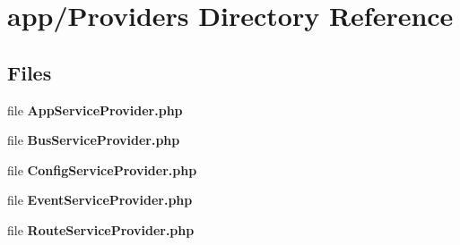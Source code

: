 \section{app/\+Providers Directory Reference}
\label{dir_d4c866bc078ab9dbd18c5ad776bfdd07}
\subsection*{Files}
\begin{DoxyCompactItemize}
\item 
file {\bf App\+Service\+Provider.\+php}
\item 
file {\bf Bus\+Service\+Provider.\+php}
\item 
file {\bf Config\+Service\+Provider.\+php}
\item 
file {\bf Event\+Service\+Provider.\+php}
\item 
file {\bf Route\+Service\+Provider.\+php}
\end{DoxyCompactItemize}

